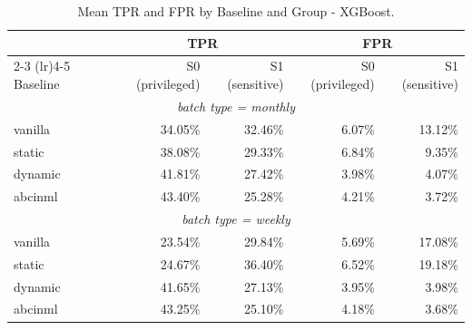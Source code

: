 \begin{table}
  \caption{Mean TPR and FPR by Baseline and Group - XGBoost.}
  \label{tab:absolute-rates-xgboost}
  \begin{tabular}{lrrrr}
    \toprule
     & \multicolumn{2}{c}{TPR} & \multicolumn{2}{c}{FPR} \\
    \cmidrule(lr){2-3} \cmidrule(lr){4-5}
    Baseline & S0 (privileged) & S1 (sensitive) & S0 (privileged) & S1 (sensitive) \\
    \midrule
    \multicolumn{5}{c}{\textit{batch type = monthly}} \\
    \midrule
    vanilla & 34.05\% & 32.46\% & 6.07\% & 13.12\% \\
    static & 38.08\% & 29.33\% & 6.84\% & 9.35\% \\
    dynamic & 41.81\% & 27.42\% & 3.98\% & 4.07\% \\
    abcinml & 43.40\% & 25.28\% & 4.21\% & 3.72\% \\
    \midrule
    \multicolumn{5}{c}{\textit{batch type = weekly}} \\
    \midrule
    vanilla & 23.54\% & 29.84\% & 5.69\% & 17.08\% \\
    static & 24.67\% & 36.40\% & 6.52\% & 19.18\% \\
    dynamic & 41.65\% & 27.13\% & 3.95\% & 3.98\% \\
    abcinml & 43.25\% & 25.10\% & 4.18\% & 3.68\% \\
    \bottomrule
  \end{tabular}
\end{table}
